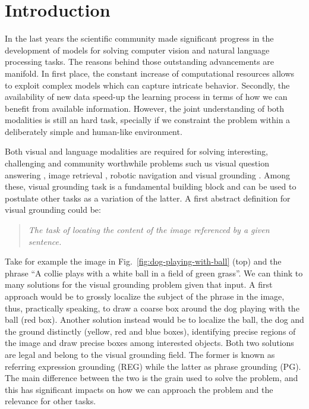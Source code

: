 \chapter{Introduction}
\label{ch:intro}

In the last years the scientific community made significant progress
in the development of models for solving computer vision and natural
language processing tasks. The reasons behind those outstanding
advancements are manifold. In first place, the constant increase of
computational resources allows to exploit complex models which can
capture intricate behavior. Secondly, the availability of new data
speed-up the learning process in terms of how we can benefit from
available information. However, the joint understanding of both
modalities is still an hard task, specially if we constraint the
problem within a deliberately simple and human-like environment.

Both visual and language modalities are required for solving
interesting, challenging and community worthwhile problems such us
visual question answering \cite{kafle2017visual}, image retrieval
\cite{gordo2016deep, radenovic2016cnn}, robotic navigation
\cite{thomason2017guiding} and visual grounding
\cite{plummer2015flickr30k,datta2019align2ground,wang2019phrase,wang2020maf,rigoni2021better}.
Among these, visual grounding task is a fundamental building block and
can be used to postulate other tasks as a variation of the latter. A
first abstract definition for visual grounding could be:

\begin{quote}
    \textit{The task of locating the content of the image referenced
    by a given sentence.}
\end{quote}

Take for example the image in Fig.~\ref{fig:dog-playing-with-ball}
(top) and the phrase ``A collie plays with a white ball in a field of
green grass''. We can think to many solutions for the visual grounding
problem given that input. A first approach would be to grossly
localize the subject of the phrase in the image, thus, practically
speaking, to draw a coarse box around the dog playing with the ball
(red box). Another solution instead would be to localize the ball, the
dog and the ground distinctly (yellow, red and blue boxes),
identifying precise regions of the image and draw precise boxes among
interested objects. Both two solutions are legal and belong to the
visual grounding field. The former is known as referring expression
grounding (REG) while the latter as phrase grounding (PG). The main
difference between the two is the grain used to solve the problem, and
this has significant impacts on how we can approach the problem and
the relevance for other tasks.

